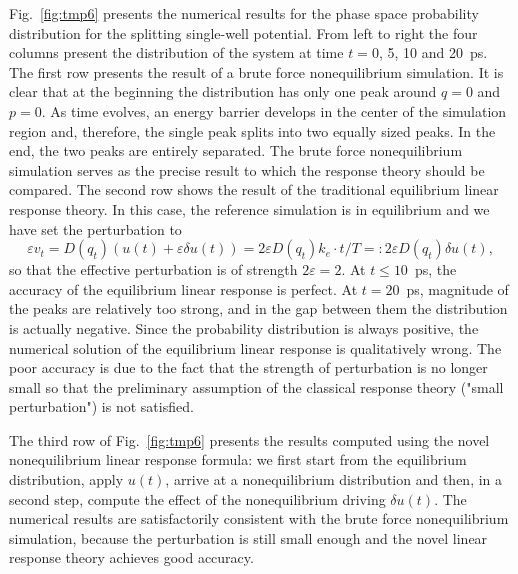 \documentclass[]{tMPH2e}
\newcommand{\eps}{\varepsilon}
\newcommand{\mt}{\mathcal T}
\begin{document}
Fig.~\ref{fig:tmp6} presents the numerical results for  the phase space probability distribution for the splitting
single-well potential. From left to right the four columns present the
distribution of the system at time $t = 0$, 5, 10 and 20~\textsf{ps}. The first
row presents the result of a brute force nonequilibrium simulation.  It is clear
that at the beginning the distribution has only one peak around $q = 0$ and $p = 0$. As  time evolves, an energy barrier develops
in the center of the simulation region and, therefore, the single peak
splits into two equally sized peaks.  In the end, the two
peaks are entirely separated.  The brute force nonequilibrium
simulation serves as the precise result to which the response theory
should be compared. The second row shows the result of the
traditional equilibrium linear response theory. In
this case, the reference simulation is in equilibrium and we have set the perturbation to
\[
\eps v_t = D(q_{t}) (u(t)+\eps\delta u(t))=2\eps D(q_{t})k_e\cdot t/T=:2\eps D(q_{t})\delta u(t),
\] 
so that the effective perturbation is of strength $2\eps = 2$.  At $t \leq
10$~\textsf{ps}, the accuracy of the equilibrium linear response is
perfect. At $t =
20$~\textsf{ps}, magnitude of the peaks are relatively too strong,
and in the gap between them the distribution is actually negative.
Since the probability distribution is always positive, the
numerical solution of the equilibrium linear response is qualitatively wrong.
The poor accuracy is due to the fact that the strength of perturbation is no
longer small so that the preliminary assumption of the classical response theory ("small perturbation")
is not satisfied.  

The third row of Fig.~\ref{fig:tmp6} presents the results computed using the novel nonequilibrium  linear response formula: we first start from the equilibrium distribution, apply  $u(t)$, arrive at a nonequilibrium distribution and then, in a second step, compute the effect of the nonequilibrium driving $\delta u(t)$.  The numerical results are satisfactorily consistent with
the brute force nonequilibrium simulation, because the perturbation is still  small enough and the novel linear response theory achieves
good accuracy.

\end{document}
